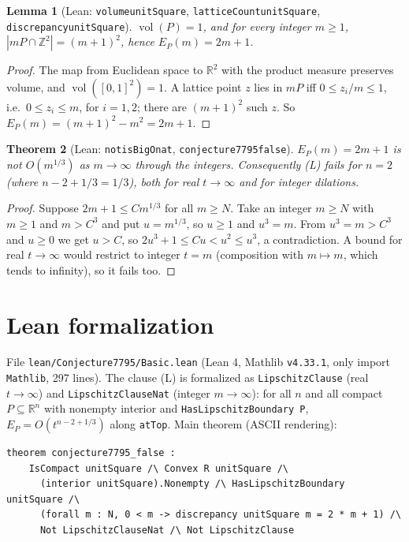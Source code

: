 \documentclass[11pt]{article}
\renewcommand{\_}{\oldus\allowbreak}
\newtheorem{theorem}{Theorem}
\newtheorem{lemma}[theorem]{Lemma}
\theoremstyle{definition}
\theoremstyle{remark}
\begin{document}
\begin{lemma}[Lean: \texttt{volume\_unitSquare}, \texttt{latticeCount\_unitSquare},
\texttt{discrepancy\_unitSquare}]
$\operatorname{vol}(P)=1$, and for every integer $m\ge1$, $|mP\cap\mathbb Z^2|=(m+1)^2$, hence
$E_P(m)=2m+1$.
\end{lemma}
\begin{proof}
The map from Euclidean space to $\mathbb R^2$ with the product measure preserves volume, and
$\operatorname{vol}([0,1]^2)=1$. A lattice point $z$ lies in $mP$ iff $0\le z_i/m\le1$, i.e.\
$0\le z_i\le m$, for $i=1,2$; there are $(m+1)^2$ such $z$. So $E_P(m)=(m+1)^2-m^2=2m+1$.
\end{proof}

\begin{theorem}[Lean: \texttt{not\_isBigO\_nat}, \texttt{conjecture7795\_false}]
$E_P(m)=2m+1$ is not $O(m^{1/3})$ as $m\to\infty$ through the integers. Consequently (L) fails for
$n=2$ (where $n-2+1/3=1/3$), both for real $t\to\infty$ and for integer dilations.
\end{theorem}
\begin{proof}
Suppose $2m+1\le C m^{1/3}$ for all $m\ge N$. Take an integer $m\ge N$ with $m\ge1$ and $m>C^3$ and
put $u=m^{1/3}$, so $u\ge1$ and $u^3=m$. From $u^3=m>C^3$ and $u\ge0$ we get $u>C$, so
$2u^3+1\le Cu<u^2\le u^3$, a contradiction. A bound for real $t\to\infty$ would restrict to integer
$t=m$ (composition with $m\mapsto m$, which tends to infinity), so it fails too.
\end{proof}

\section{Lean formalization}
File \texttt{lean/Conjecture7795/Basic.lean} (Lean 4, Mathlib \texttt{v4.33.1}, only import
\texttt{Mathlib}, 297 lines). The clause (L) is formalized as \texttt{LipschitzClause} (real
$t\to\infty$) and \texttt{LipschitzClauseNat} (integer $m\to\infty$): for all $n$ and all compact
$P\subseteq\mathbb R^n$ with nonempty interior and \texttt{HasLipschitzBoundary P},
$E_P=O(t^{n-2+1/3})$ along \texttt{atTop}. Main theorem (ASCII rendering):
\begin{verbatim}
theorem conjecture7795_false :
    IsCompact unitSquare /\ Convex R unitSquare /\
      (interior unitSquare).Nonempty /\ HasLipschitzBoundary unitSquare /\
      (forall m : N, 0 < m -> discrepancy unitSquare m = 2 * m + 1) /\
      Not LipschitzClauseNat /\ Not LipschitzClause
\end{verbatim}
\end{document}
